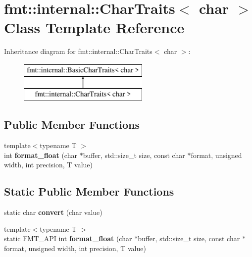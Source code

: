 \hypertarget{classfmt_1_1internal_1_1CharTraits_3_01char_01_4}{}\section{fmt\+:\+:internal\+:\+:Char\+Traits$<$ char $>$ Class Template Reference}
\label{classfmt_1_1internal_1_1CharTraits_3_01char_01_4}
Inheritance diagram for fmt\+:\+:internal\+:\+:Char\+Traits$<$ char $>$\+:\begin{figure}[H]
\begin{center}
\leavevmode
\includegraphics[height=2.000000cm]{classfmt_1_1internal_1_1CharTraits_3_01char_01_4}
\end{center}
\end{figure}
\subsection*{Public Member Functions}
\begin{DoxyCompactItemize}
\item 
{\footnotesize template$<$typename T $>$ }\\int {\bfseries format\+\_\+float} (char $\ast$buffer, std\+::size\+\_\+t size, const char $\ast$format, unsigned width, int precision, T value)\hypertarget{classfmt_1_1internal_1_1CharTraits_3_01char_01_4_a378a229c5a4846ffa8f4eb119534a002}{}\label{classfmt_1_1internal_1_1CharTraits_3_01char_01_4_a378a229c5a4846ffa8f4eb119534a002}

\end{DoxyCompactItemize}
\subsection*{Static Public Member Functions}
\begin{DoxyCompactItemize}
\item 
static char {\bfseries convert} (char value)\hypertarget{classfmt_1_1internal_1_1CharTraits_3_01char_01_4_a4503977c29c6347f94b829728c42997c}{}\label{classfmt_1_1internal_1_1CharTraits_3_01char_01_4_a4503977c29c6347f94b829728c42997c}

\item 
{\footnotesize template$<$typename T $>$ }\\static F\+M\+T\+\_\+\+A\+PI int {\bfseries format\+\_\+float} (char $\ast$buffer, std\+::size\+\_\+t size, const char $\ast$format, unsigned width, int precision, T value)\hypertarget{classfmt_1_1internal_1_1CharTraits_3_01char_01_4_a0ae1f571ad4676bbc4ff7aafb5312176}{}\label{classfmt_1_1internal_1_1CharTraits_3_01char_01_4_a0ae1f571ad4676bbc4ff7aafb5312176}

\end{DoxyCompactItemize}
